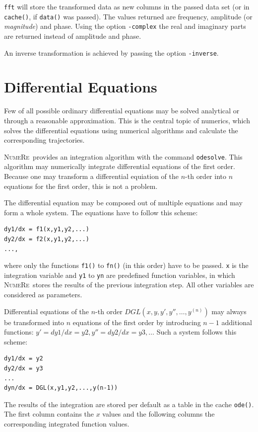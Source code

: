 \documentclass[DIV=14,headsepline,footsepline]{scrbook}
\newcommand{\NR}{\textsc{Nu\-me\-Re}}
\begin{document}
				\verb+fft+ will store the transformed data as new columns in the passed data set (or in \verb+cache()+, if \verb+data()+ was passed). The values returned are frequency, amplitude (or \emph{magnitude}) and phase. Using the option \verb+-complex+ the real and imaginary parts are returned instead of amplitude and phase.
				
				An inverse transformation is achieved by passing the option \verb+-inverse+.
				
			\section{Differential Equations}
				Few of all possible ordinary differential equations may be solved analytical or through a reasonable approximation. This is the central topic of numerics, which solves the differential equations using numerical algorithms and calculate the corresponding trajectories.
				
				\NR\ provides an integration algorithm with the command \verb+odesolve+. This algorithm may numerically integrate differential equations of the first order. Because one may transform a differential equiation of the $n$-th order into $n$ equations for the first order, this is not a problem.
				
				The differential equation may be composed out of multiple equations and may form a whole system. The equations have to follow this scheme:
				\begin{lstlisting}
dy1/dx = f1(x,y1,y2,...)
dy2/dx = f2(x,y1,y2,...)
...,				
				\end{lstlisting}
				where only the functions \verb+f1()+ to \verb+fn()+ (in this order) have to be passed. \verb+x+ is the integration variable and \verb+y1+ to \verb+yn+ are predefined function variables, in which \NR\ stores the results of the previous integration step. All other variables are considered as parameters.
	
				Differential equations of the $n$-th order $DGL(x,y,y',y'',\ldots,y^{(n)})$ may always be transformed into $n$ equations of the first order by introducing $n-1$ additional functions: $y' = dy1/dx = y2, y'' = dy2/dx = y3, \ldots$ Such a system follows this scheme:
				\begin{lstlisting}
dy1/dx = y2
dy2/dx = y3
...
dyn/dx = DGL(x,y1,y2,...,y(n-1))
				\end{lstlisting}
	
				The results of the integration are stored per default as a table in the cache \verb+ode()+. The first column contains the $x$ values and the following columns the corresponding integrated function values.
				
\end{document}
